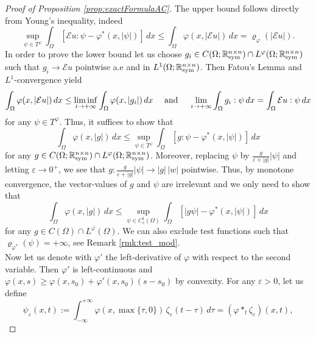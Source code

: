 \documentclass[a4paper,11pt,oneside,notitlepage]{article}
\numberwithin{equation}{section}
\def\R{\mathbb{R}}
\def\sym{{\rm sym}}
\newcommand{\e}{\varepsilon}
\newcommand{\vphi}{\varphi}
\newcommand{\vrho}{\varrho}
\newcommand{\E}{\mathcal{E}}
\begin{document}
\begin{proof}[Proof of Proposition \ref{prop:exactFormulaAC}]
    The upper bound follows directly from Young's inequality, indeed
    \begin{equation*}
        \sup_{\psi \in T^\vphi} \int_\Omega [\E u : \psi - \vphi^*(x, |\psi|)] \, dx \le \int_\Omega \vphi(x, |\E u|) \, dx = \vrho_\vphi(|\E u|).
    \end{equation*}
    In order to prove the lower bound let us choose $g_i \in C(\Omega; \R^{n \times n}_\sym) \cap L^\vphi(\Omega; \R^{n \times n}_\sym)$ such that $g_i \to \E u$ pointwise a.e and in $L^1(\Omega; \R^{n \times n}_\sym)$. Then Fatou's Lemma and $L^1$-convergence yield
    \begin{equation*}
        \int_\Omega \vphi(x, |\E u|) \, dx \le \liminf_{i \to +\infty} \int_\Omega \vphi(x, |g_i|) \, dx
        \quad \textnormal{ and } \quad
        \lim_{i \to +\infty} \int_\Omega g_i : \psi \, dx = \int_\Omega \E u : \psi \, dx 
    \end{equation*}
    for any $\psi \in T^\vphi$. Thus, it suffices to show that 
    \begin{equation*}
        \int_\Omega \vphi(x, |g|) \, dx \le \sup_{\psi \in T^\vphi} \int_\Omega [g : \psi - \vphi^*(x, |\psi|)] \, dx
    \end{equation*}
    for any $g \in C(\Omega; \R^{n \times n}_\sym) \cap L^\vphi(\Omega; \R^{n \times n}_\sym)$. Moreover, replacing $\psi$ by $\frac{g}{\e + |g|} |\psi|$ and letting $\e \to 0^+$, we see that $g :  \frac{g}{\e + |g|} |\psi| \to |g| \, |w|$ pointwise. Thus, by monotone convergence, the vector-values of $g$ and $\psi$ are irrelevant and we only need to show that 
    \begin{equation}
    \label{eq:thesis_2}
        \int_\Omega \vphi(x, |g|) \, dx \le \sup_{\psi \in C^1_c(\Omega)} \int_\Omega [|g \psi| - \vphi^*(x, |\psi|)] \, dx 
    \end{equation}
    for any $g\in C(\Omega) \cap L^\vphi(\Omega)$. We can also exclude test functions such that $\vrho_{\vphi^*}(\psi) = +\infty$, see Remark \ref{rmk:test_mod}.
    \\
    Now let us denote with $\vphi'$ the left-derivative of $\vphi$ with respect to the second variable. Then $\vphi'$ is left-continuous and $\vphi(x,s) \ge \vphi(x,s_0) + \vphi'(x,s_0)(s-s_0)$ by convexity. For any $\e > 0$, let us define 
    \begin{equation}
    \label{final_choice}
        \psi_\e(x,t) := \int_{-\infty}^{+\infty} \vphi(x, \max\{\tau,0\}) \, \zeta_\e(t-\tau) \, d\tau = (\vphi *_t \zeta_\e)(x, t),

\end{equation}
\end{proof}
\end{document}
